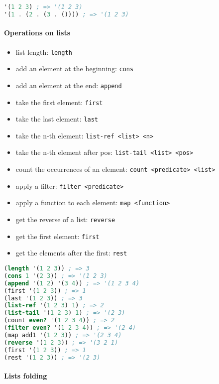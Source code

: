 \documentclass[a4paper,landscape,10pt]{article}
\begin{document}
\begin{multicols*}{2}
  \begin{lstlisting}[language=Scheme]
'(1 2 3) ; => '(1 2 3)
'(1 . (2 . (3 . ()))) ; => '(1 2 3)
\end{lstlisting}

  \paragraph{Operations on lists}

  \begin{itemize}
    \item list length: \texttt{length}
    \item add an element at the beginning: \texttt{cons}
    \item add an element at the end: \texttt{append}
    \item take the first element: \texttt{first}
    \item take the last element: \texttt{last}
    \item take the n-th element: \texttt{list-ref <list> <n>}
    \item take the n-th element after pos: \texttt{list-tail <list> <pos>}
    \item count the occurrences of an element: \texttt{count <predicate> <list>}
    \item apply a filter: \texttt{filter <predicate>}
    \item apply a function to each element: \texttt{map <function>}
    \item get the reverse of a list: \texttt{reverse}
    \item get the first element: \texttt{first}
    \item get the elements after the first: \texttt{rest}
  \end{itemize}

  \begin{lstlisting}[language=Scheme]
(length '(1 2 3)) ; => 3
(cons 1 '(2 3)) ; => '(1 2 3)
(append '(1 2) '(3 4)) ; => '(1 2 3 4)
(first '(1 2 3)) ; => 1
(last '(1 2 3)) ; => 3
(list-ref '(1 2 3) 1) ; => 2
(list-tail '(1 2 3) 1) ; => '(2 3)
(count even? '(1 2 3 4)) ; => 2
(filter even? '(1 2 3 4)) ; => '(2 4)
(map add1 '(1 2 3)) ; => '(2 3 4)
(reverse '(1 2 3)) ; => '(3 2 1)
(first '(1 2 3)) ; => 1
(rest '(1 2 3)) ; => '(2 3)
\end{lstlisting}

  \paragraph{Lists folding}


\end{multicols*}
\end{document}
